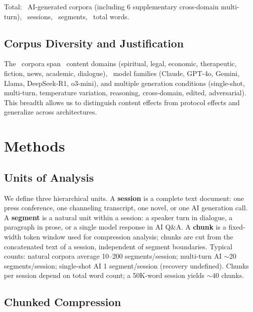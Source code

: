 \documentclass[final]{clv2025}
\begin{document}
Total: \nAI\ AI-generated corpora (including 6 supplementary cross-domain multi-turn), \nAISessions\ sessions, \nAISegments\ segments, \nAIWords\ total words.

\subsection{Corpus Diversity and Justification}

The \nCorpora\ corpora span \nDomains\ content domains (spiritual, legal, economic, therapeutic, fiction, news, academic, dialogue), \nModels\ model families (Claude, GPT-4o, Gemini, Llama, DeepSeek-R1, o3-mini), and multiple generation conditions (single-shot, multi-turn, temperature variation, reasoning, cross-domain, edited, adversarial). This breadth allows us to distinguish content effects from protocol effects and generalize across architectures.


\section{Methods}

\subsection{Units of Analysis}

We define three hierarchical units. A \textbf{session} is a complete text document: one press conference, one channeling transcript, one novel, or one AI generation call. A \textbf{segment} is a natural unit within a session: a speaker turn in dialogue, a paragraph in prose, or a single model response in AI Q\&A. A \textbf{chunk} is a fixed-width \chunkTokens\-token window used for compression analysis; chunks are cut from the concatenated text of a session, independent of segment boundaries. Typical counts: natural corpora average 10--200 segments/session; multi-turn AI $\sim$20 segments/session; single-shot AI 1 segment/session (recovery undefined). Chunks per session depend on total word count; a 50K-word session yields $\sim$40 chunks.

\subsection{Chunked Compression}
\end{document}
